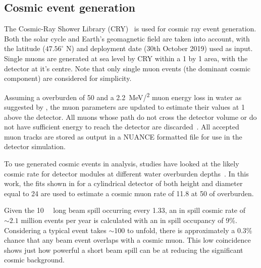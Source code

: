\subsection{Cosmic event generation} %
\label{sec:chips_monte_carlo_cosmic} %

The Cosmic-Ray Shower Library (CRY)~\cite{hagmann2012_1, hagmann2012_2} is used for cosmic ray
event generation. Both the solar cycle and Earth's geomagnetic field are taken into account, with
the \mbox{\chipsfive} latitude ($47.56^{\circ}$ N) and deployment date (30th October 2019) used as
input. Single muons are generated at sea level by CRY within a \SI{1}{} by
\SI{1}{} area, with the detector at it's centre. Note that only single muon events (the
dominant cosmic component) are considered for simplicity.

Assuming a \chipsfive overburden of \SI{50}{} and a \SI{2.2}{\MeV/^{2}} muon
energy loss in water as suggested by , the muon parameters are updated
to estimate their values at \SI{1}{} above the detector. All muons whose path do not cross
the detector volume or do not have sufficient energy to reach the detector are
discarded~\cite{chipsgen2020}. All accepted muon tracks are stored as output in a NUANCE formatted
file for use in the detector simulation.

To use generated cosmic events in analysis, studies have looked at the likely cosmic rate for
\chips detector modules at different water overburden depths~\cite{son2013}. In this work, the
fits shown in  for a cylindrical detector of both height and diameter
equal to \SI{24}{} are used to estimate a \chipsfive cosmic muon rate of
\SI{11.8}{} at \SI{50}{} of overburden.

Given the \SI{10}{\micro{}} long \numi beam spill occurring every \SI{1.33}{},
an in spill cosmic rate of $\sim2.1$ million events per year is calculated with an in spill
occupancy of 9\%. Considering a typical event takes $\sim$\SI{100}{} to unfold, there is
approximately a 0.3\% chance that any beam event overlaps with a cosmic muon. This low coincidence
shows just how powerful a short beam spill can be at reducing the significant cosmic background.

